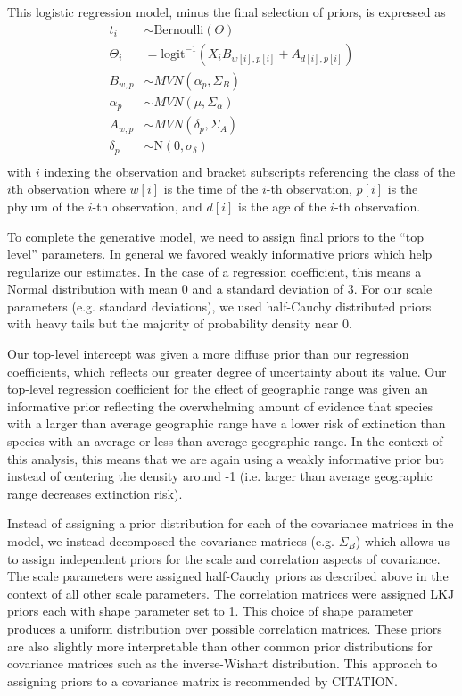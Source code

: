 \documentclass[12pt,letterpaper]{article}
\begin{document}
This logistic regression model, minus the final selection of priors, is expressed as 
\begin{equation}
  \begin{aligned}
    t_{i} &\sim \text{Bernoulli}(\Theta) \\
    \Theta_{i} &= \text{logit}^{-1} (X_{i} B_{w[i], p[i]} + A_{d[i], p[i]}) \\
    B_{w, p} &\sim MVN(\alpha_{p}, \Sigma_{B}) \\
    \alpha_{p} &\sim MVN(\mu, \Sigma_{\alpha}) \\
    A_{w, p} &\sim MVN(\delta_{p}, \Sigma_{A}) \\
    \delta_{p} &\sim \mathrm{N}(0, \sigma_{\delta}) \\
  \end{aligned}
  \label{eq:core}
\end{equation}
with \(i\) indexing the observation and bracket subscripts referencing the class of the \(i\)th observation where \(w[i]\) is the time of the \(i\)-th observation, \(p[i]\) is the phylum of the \(i\)-th observation, and \(d[i]\) is the age of the \(i\)-th observation. 

To complete the generative model, we need to assign final priors to the ``top level'' parameters. In general we favored weakly informative priors which help regularize our estimates. In the case of a regression coefficient, this means a Normal distribution with mean 0 and a standard deviation of 3. For our scale parameters (e.g. standard deviations), we used half-Cauchy distributed priors with heavy tails but the majority of probability density near 0.

Our top-level intercept was given a more diffuse prior than our regression coefficients, which reflects our greater degree of uncertainty about its value. Our top-level regression coefficient for the effect of geographic range was given an informative prior reflecting the overwhelming amount of evidence that species with a larger than average geographic range have a lower risk of extinction than species with an average or less than average geographic range. In the context of this analysis, this means that we are again using a weakly informative prior but instead of centering the density around -1 (i.e. larger than average geographic range decreases extinction risk).

Instead of assigning a prior distribution for each of the covariance matrices in the model, we instead decomposed the covariance matrices (e.g. \(\Sigma_{B}\)) which allows us to assign independent priors for the scale and correlation aspects of covariance. The scale parameters were assigned half-Cauchy priors as described above in the context of all other scale parameters. The correlation matrices were assigned LKJ priors each with shape parameter set to 1. This choice of shape parameter produces a uniform distribution over possible correlation matrices. These priors are also slightly more interpretable than other common prior distributions for covariance matrices such as the inverse-Wishart distribution. This approach to assigning priors to a covariance matrix is recommended by CITATION.
\end{document}
